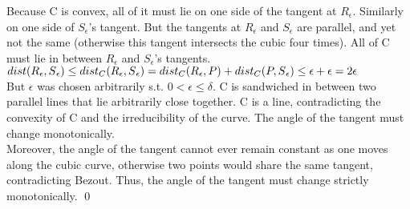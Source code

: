 Because C is convex, all of it must lie on one side of the tangent
at $R_{\epsilon}$.  Similarly on one side of $S_{\epsilon}$'s tangent.
But the tangents at $R_{\epsilon}$ and $S_{\epsilon}$ are parallel, and 
yet not the same (otherwise this tangent intersects the cubic four times).
\hence All of C must lie in between $R_{\epsilon}$ and $S_{\epsilon}$'s
tangents.\\
$dist(R\mbox{$_{\epsilon}$},S\mbox{$_{\epsilon}$}) \leq dist_{C}(R\mbox{$_{\epsilon}$},S\mbox{$_{\epsilon}$}) = dist_{C}(R\mbox{$_{\epsilon}$},P) + dist_{C}
(P,S\mbox{$_{\epsilon}$}) \leq \epsilon + \epsilon = 2\epsilon$\\
But $\epsilon$ was chosen arbitrarily s.t. $0 < \epsilon \leq \delta$.
\hence C is sandwiched in between two parallel lines that lie arbitrarily
close together.
\hence C is a line, contradicting the convexity of C and the irreducibility
of the curve.
\hence The angle of the tangent must change monotonically.\\
Moreover, the angle of the tangent cannot ever 
remain constant as one moves along
the cubic curve, otherwise two points would share the same tangent, 
contradicting Bezout.  Thus, the angle of the tangent must change strictly
monotonically.
\qed
